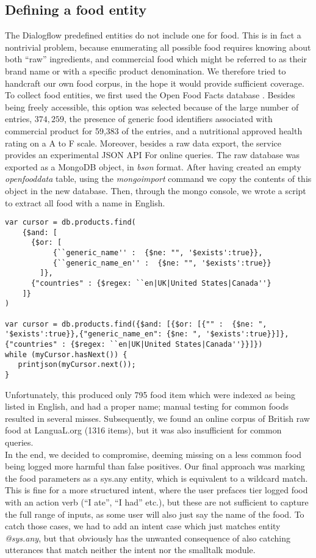 \subsection{Defining a food entity}
The Dialogflow predefined entities do not include one for food. This is in fact a nontrivial problem, because enumerating all possible food requires knowing about both ``raw'' ingredients, and commercial food which might be referred to as their brand name or with a specific product denomination. We therefore tried to handcraft our own food corpus, in the hope it would provide sufficient coverage.
To collect food entities, we first used the Open Food Facts database \cite{openfoodfacts}. Besides being freely accessible, this option was selected because of the large number of entries, $374,259$, the presence of generic food identifiers associated with commercial product for 59,383 of the entries, and a nutritional approved health rating on a A to F scale. Moreover, besides a raw data export, the service provides an experimental JSON API For online queries. 
The raw database was exported as a MongoDB \cite{mongo} object, in \textit{bson} format. After having created an empty \textit{openfooddata} table, using the \textit{mongoimport} command we copy the contents of this object in the new database. Then, through the mongo console, we wrote a script to extract all food with a name in English.
\begin{lstlisting}
var cursor = db.products.find( 
    {$and: [
      {$or: [
           {``generic_name'' :  {$ne: "", '$exists':true}},
           {``generic_name_en'' :  {$ne: "", '$exists':true}}
        ]},
      {"countries" : {$regex: ``en|UK|United States|Canada''}
    ]}
)

var cursor = db.products.find({$and: [{$or: [{"" :  {$ne: ", '$exists':true}},{"generic_name_en": {$ne: ", '$exists':true}}]}, {"countries" : {$regex: ``en|UK|United States|Canada''}}]})
while (myCursor.hasNext()) {
   printjson(myCursor.next());
}
\end{lstlisting}
Unfortunately, this produced only 795 food item which were indexed as being listed in English, and had a proper name; manual testing for common foods resulted in several misses.
 Subsequently, we found an online corpus of British raw food at LanguaL.org \cite{langual}(1316 items), but it was also insufficient for common queries. \\
In the end, we decided to compromise, deeming missing on a less common food being logged more harmful than false positives. Our final approach was marking the food parameters as a sys.any entity, which is equivalent to a wildcard match. This is fine for a more structured intent, where the user prefaces tier logged food with an action verb (``I ate'', ``I had'' etc.), but these are not sufficient to capture the full range of inputs, as some user will also just say the name of the food. To catch those cases, we had to add an intent case which just matches entity \textit{@sys.any}, but that obviously has the unwanted consequence of also catching utterances that match neither the intent nor the smalltalk module.
